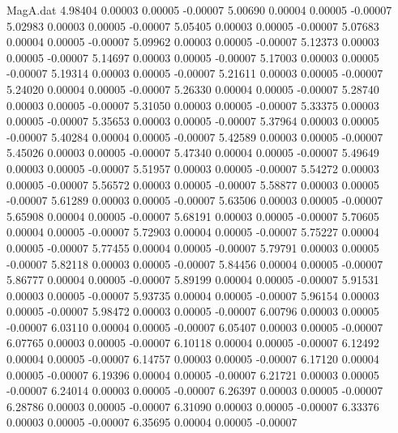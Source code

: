 \begin{filecontents}{MagA.dat}
   4.98404    0.00003    0.00005   -0.00007
   5.00690    0.00004    0.00005   -0.00007
   5.02983    0.00003    0.00005   -0.00007
   5.05405    0.00003    0.00005   -0.00007
   5.07683    0.00004    0.00005   -0.00007
   5.09962    0.00003    0.00005   -0.00007
   5.12373    0.00003    0.00005   -0.00007
   5.14697    0.00003    0.00005   -0.00007
   5.17003    0.00003    0.00005   -0.00007
   5.19314    0.00003    0.00005   -0.00007
   5.21611    0.00003    0.00005   -0.00007
   5.24020    0.00004    0.00005   -0.00007
   5.26330    0.00004    0.00005   -0.00007
   5.28740    0.00003    0.00005   -0.00007
   5.31050    0.00003    0.00005   -0.00007
   5.33375    0.00003    0.00005   -0.00007
   5.35653    0.00003    0.00005   -0.00007
   5.37964    0.00003    0.00005   -0.00007
   5.40284    0.00004    0.00005   -0.00007
   5.42589    0.00003    0.00005   -0.00007
   5.45026    0.00003    0.00005   -0.00007
   5.47340    0.00004    0.00005   -0.00007
   5.49649    0.00003    0.00005   -0.00007
   5.51957    0.00003    0.00005   -0.00007
   5.54272    0.00003    0.00005   -0.00007
   5.56572    0.00003    0.00005   -0.00007
   5.58877    0.00003    0.00005   -0.00007
   5.61289    0.00003    0.00005   -0.00007
   5.63506    0.00003    0.00005   -0.00007
   5.65908    0.00004    0.00005   -0.00007
   5.68191    0.00003    0.00005   -0.00007
   5.70605    0.00004    0.00005   -0.00007
   5.72903    0.00004    0.00005   -0.00007
   5.75227    0.00004    0.00005   -0.00007
   5.77455    0.00004    0.00005   -0.00007
   5.79791    0.00003    0.00005   -0.00007
   5.82118    0.00003    0.00005   -0.00007
   5.84456    0.00004    0.00005   -0.00007
   5.86777    0.00004    0.00005   -0.00007
   5.89199    0.00004    0.00005   -0.00007
   5.91531    0.00003    0.00005   -0.00007
   5.93735    0.00004    0.00005   -0.00007
   5.96154    0.00003    0.00005   -0.00007
   5.98472    0.00003    0.00005   -0.00007
   6.00796    0.00003    0.00005   -0.00007
   6.03110    0.00004    0.00005   -0.00007
   6.05407    0.00003    0.00005   -0.00007
   6.07765    0.00003    0.00005   -0.00007
   6.10118    0.00004    0.00005   -0.00007
   6.12492    0.00004    0.00005   -0.00007
   6.14757    0.00003    0.00005   -0.00007
   6.17120    0.00004    0.00005   -0.00007
   6.19396    0.00004    0.00005   -0.00007
   6.21721    0.00003    0.00005   -0.00007
   6.24014    0.00003    0.00005   -0.00007
   6.26397    0.00003    0.00005   -0.00007
   6.28786    0.00003    0.00005   -0.00007
   6.31090    0.00003    0.00005   -0.00007
   6.33376    0.00003    0.00005   -0.00007
   6.35695    0.00004    0.00005   -0.00007

\end{filecontents}
